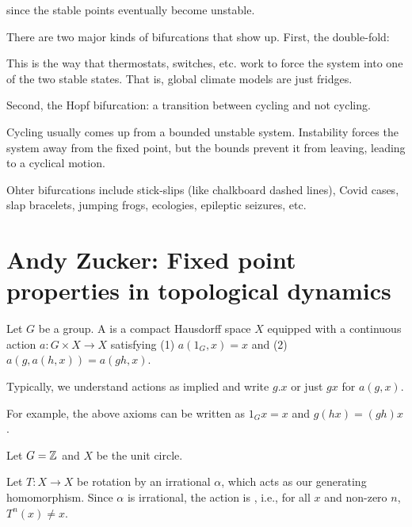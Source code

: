 \documentclass[class=pmath370,tikz,notes]{agony}
\begin{document}
since the stable points eventually become unstable.

There are two major kinds of bifurcations that show up.
First, the double-fold:

\begin{center}
  
\end{center}

This is the way that thermostats, switches, etc. work to force
the system into one of the two stable states.
That is, global climate models are just fridges.

Second, the Hopf bifurcation:
a transition between cycling and not cycling.

\begin{center}
  
\end{center}

Cycling usually comes up from a bounded unstable system.
Instability forces the system away from the fixed point,
but the bounds prevent it from leaving,
leading to a cyclical motion.

\begin{center}
  
\end{center}

Ohter bifurcations include stick-slips (like chalkboard dashed lines),
Covid cases, slap bracelets, jumping frogs, ecologies, epileptic seizures, etc.

\section{Andy Zucker: Fixed point properties in topological dynamics}

\begin{defn}
  Let $G$ be a group. A  is a compact Hausdorff space $X$
  equipped with a continuous action $a : G \times X \to X$ satisfying
  (1) $a(1_G,x) = x$ and (2) $a(g,a(h,x)) = a(gh,x)$.
\end{defn}

\begin{notation}
  Typically, we understand actions as implied and write $g.x$ or just $gx$ for $a(g,x)$.

  For example, the above axioms can be written as $1_Gx = x$ and $g(hx) = (gh)x$.
\end{notation}

\begin{example}
  Let $G = \mathbb{Z}$ and $X$ be the unit circle.

  Let $T : X \to X$ be rotation by an irrational $\alpha$,
  which acts as our generating homomorphism.
  Since $\alpha$ is irrational, the action is , i.e.,
  for all $x$ and non-zero $n$, $T^n(x) \neq x$.
\end{example}
\end{document}
